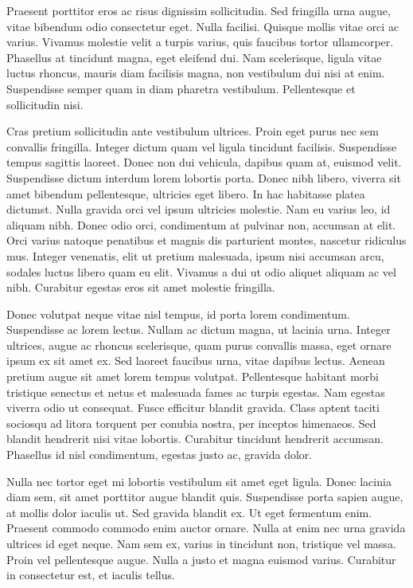 Praesent porttitor eros ac risus dignissim sollicitudin. Sed fringilla urna augue, vitae bibendum odio consectetur eget. Nulla facilisi. Quisque mollis vitae orci ac varius. Vivamus molestie velit a turpis varius, quis faucibus tortor ullamcorper. Phasellus at tincidunt magna, eget eleifend dui. Nam scelerisque, ligula vitae luctus rhoncus, mauris diam facilisis magna, non vestibulum dui nisi at enim. Suspendisse semper quam in diam pharetra vestibulum. Pellentesque et sollicitudin nisi.

Cras pretium sollicitudin ante vestibulum ultrices. Proin eget purus nec sem convallis fringilla. Integer dictum quam vel ligula tincidunt facilisis. Suspendisse tempus sagittis laoreet. Donec non dui vehicula, dapibus quam at, euismod velit. Suspendisse dictum interdum lorem lobortis porta. Donec nibh libero, viverra sit amet bibendum pellentesque, ultricies eget libero. In hac habitasse platea dictumst. Nulla gravida orci vel ipsum ultricies molestie. Nam eu varius leo, id aliquam nibh. Donec odio orci, condimentum at pulvinar non, accumsan at elit. Orci varius natoque penatibus et magnis dis parturient montes, nascetur ridiculus mus. Integer venenatis, elit ut pretium malesuada, ipsum nisi accumsan arcu, sodales luctus libero quam eu elit. Vivamus a dui ut odio aliquet aliquam ac vel nibh. Curabitur egestas eros sit amet molestie fringilla.

Donec volutpat neque vitae nisl tempus, id porta lorem condimentum. Suspendisse ac lorem lectus. Nullam ac dictum magna, ut lacinia urna. Integer ultrices, augue ac rhoncus scelerisque, quam purus convallis massa, eget ornare ipsum ex sit amet ex. Sed laoreet faucibus urna, vitae dapibus lectus. Aenean pretium augue sit amet lorem tempus volutpat. Pellentesque habitant morbi tristique senectus et netus et malesuada fames ac turpis egestas. Nam egestas viverra odio ut consequat. Fusce efficitur blandit gravida. Class aptent taciti sociosqu ad litora torquent per conubia nostra, per inceptos himenaeos. Sed blandit hendrerit nisi vitae lobortis. Curabitur tincidunt hendrerit accumsan. Phasellus id nisl condimentum, egestas justo ac, gravida dolor.

Nulla nec tortor eget mi lobortis vestibulum sit amet eget ligula. Donec lacinia diam sem, sit amet porttitor augue blandit quis. Suspendisse porta sapien augue, at mollis dolor iaculis ut. Sed gravida blandit ex. Ut eget fermentum enim. Praesent commodo commodo enim auctor ornare. Nulla at enim nec urna gravida ultrices id eget neque. Nam sem ex, varius in tincidunt non, tristique vel massa. Proin vel pellentesque augue. Nulla a justo et magna euismod varius. Curabitur in consectetur est, et iaculis tellus.

